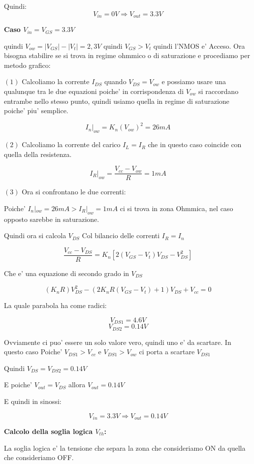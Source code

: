 \documentclass[\main/main.tex]{subfiles}
\begin{document}
Quindi:
\[V_{in} = 0V \Rightarrow V_{out} = 3.3V\]


\textbf{Caso $V_{in} = V_{GS} = 3.3V$}

quindi $V_{ow} = |V_{GS}| - |V_t| = 2,3V$ quindi $V_{GS} > V_t$ quindi l'NMOS e' Acceso.
Ora bisogna stabilire se si trova in regime ohmmico o di saturazione e procediamo per metodo grafico:

$(1)$ Calcoliamo la corrente $I_{DS}$ quando $V_{DS} = V_{ow}$ e possiamo usare una qualunque tra le due equazioni poiche' in corrispondenza di $V_{ow}$ si raccordano entrambe nello stesso punto, quindi usiamo quella in regime di saturazione poiche' piu' semplice.

\[I_n|_{ow} = K_n \left(V_{ow}\right)^2 = 26mA\]

$(2)$ Calcoliamo la corrente del carico $I_{L} = I_{R}$ che in questo caso coincide con quella della resistenza.

\[I_R|_{ow} = \frac{V_{cc} - V_{ow}}{R} = 1mA\]

$(3)$ Ora si confrontano le due correnti:

Poiche' $I_n|_{ow} = 26mA > I_R|_{ow} = 1mA$ ci si trova in zona Ohmmica, nel caso opposto sarebbe in saturazione.

Quindi ora si calcola $V_{DS}$ Col bilancio delle correnti $I_R = I_n$

\[\frac{V_{cc} - V_{DS}}{R} = K_n \left[ 2 \left(V_{GS} - V_t \right)V_{DS} - V_{DS}^2 \right]\]

Che e' una equazione di secondo grado in $V_{DS}$

\[\left(K_n R \right) V_{DS}^2 - \left(2K_nR\left(V_{GS}-V_t\right)+1\right)V_{DS}+V_{cc} = 0\]

La quale parabola ha come radici:

\[V_{DS1} = 4.6V \]
\[V_{DS2} = 0.14V \]

Ovviamente ci puo' essere un solo valore vero, quindi uno e' da scartare.
In questo caso Poiche' $V_{DS1} > V_{cc}$ e $V_{DS1} > V_{ow}$ ci porta a scartare $V_{DS1}$

Quindi $V_{DS} = V_{DS2} = 0.14V$

E poiche' $V_{out} = V_{DS}$ allora $V_{out} = 0.14V$

E quindi in sinossi:

\[V_{in} = 3.3V \Rightarrow V_{out} = 0.14V\]

\clearpage
\textbf{Calcolo della soglia logica $V_{th}$:}

La soglia logica e' la tensione che separa la zona che consideriamo ON da quella che consideriamo OFF.
\end{document}

